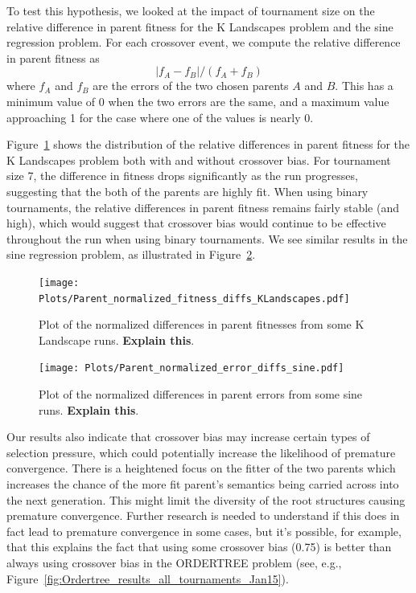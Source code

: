 \documentclass{sig-alternate}
\begin{document}

To test this hypothesis, we looked at the impact of tournament size on the relative difference in parent fitness for
the K Landscapes problem and the sine regression problem. For each crossover event, we compute the relative difference
in parent fitness as
\[
	|f_A - f_B| / (f_A + f_B)
\]
where $f_A$ and $f_B$ are the errors of the two chosen parents $A$ and $B$. This has a minimum value of 0 when the two
errors are the same, and a maximum value approaching 1 for the case where one of the values is nearly 0.

Figure~\ref{fig:parentDiffsKLandscapes} shows the distribution of the relative differences in parent fitness for the K
Landscapes problem both with and without crossover bias. For tournament size 7, the difference in fitness drops
significantly as the run progresses, suggesting that the both of the parents are highly fit. When using binary
tournaments, the relative differences in parent fitness remains fairly stable (and high), which would suggest that
crossover bias would continue to be effective throughout the run when using binary tournaments. We see similar results
in the sine regression problem, as illustrated in Figure~\ref{fig:parentDiffsSine}.

\begin{figure}
\centering
\texttt{[image: Plots/Parent\_normalized\_fitness\_diffs\_KLandscapes.pdf]}
\caption{Plot of the normalized differences in parent fitnesses from some K Landscape runs. \textbf{Explain this}.}
\label{fig:parentDiffsKLandscapes}
\end{figure}

\begin{figure}
	\centering
	\texttt{[image: Plots/Parent\_normalized\_error\_diffs\_sine.pdf]}
	\caption{Plot of the normalized differences in parent errors from some sine runs. \textbf{Explain this}.}
	\label{fig:parentDiffsSine}
\end{figure}

Our results also indicate that crossover bias may increase certain types of selection pressure, which could potentially
increase the likelihood of premature convergence.
There is a heightened focus on the fitter of the two parents which increases the chance of the more fit parent's
semantics being carried across into the next generation. This might limit the diversity of the root structures causing
premature convergence. Further research is needed to understand if this does in fact lead to premature convergence in
some cases, but it's possible, for example, that this explains the fact that using some crossover bias (0.75) is better
than always using crossover bias in the ORDERTREE problem (see, e.g.,
Figure~\ref{fig:Ordertree_results_all_tournaments_Jan15}).
\end{document}
